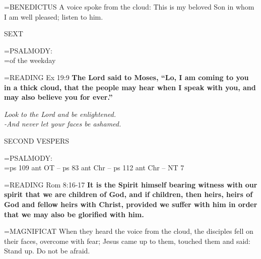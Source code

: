 \hangindent=\parindent \small{BENEDICTUS  A voice spoke from the cloud: This is my beloved Son in
whom I am well pleased; listen to him.\\}
 
\begin{flushleft}\normalsize SEXT\\\end{flushleft}

\hangindent=\parindent \small{PSALMODY:}\\
\hangindent=\parindent  of the weekday\vspace{0.5em}

\hangindent=\parindent \small{READING} Ex 19:9 \textbf{The Lord said to Moses, “Lo, I am coming to you in
a thick cloud, that the people may hear when I speak with you, and
may also believe you for ever.”}
 
\begin{center}
\textit{Look to the Lord and be enlightened.\\
-And never let your faces be ashamed.}
\end{center}

\begin{flushleft}\normalsize SECOND VESPERS\\\end{flushleft}

\hangindent=\parindent \small{PSALMODY:}\\
\hangindent=\parindent  ps 109 ant OT -- ps 83 ant Chr -- ps 112 ant Chr -- NT 7\vspace{0.5em}

\hangindent=\parindent \small{READING} Rom 8:16-17 \textbf{It is the Spirit himself bearing witness with our
spirit that we are children of God, and if children, then heirs, heirs
of God and fellow heirs with Christ, provided we suffer with him
in order that we may also be glorified with him.\\}
 
\hangindent=\parindent \small{MAGNIFICAT  When they heard the voice from the cloud, the disciples
fell on their faces, overcome with fear; Jesus came up to them,
touched them and said: Stand up. Do not be afraid.\\}
 
